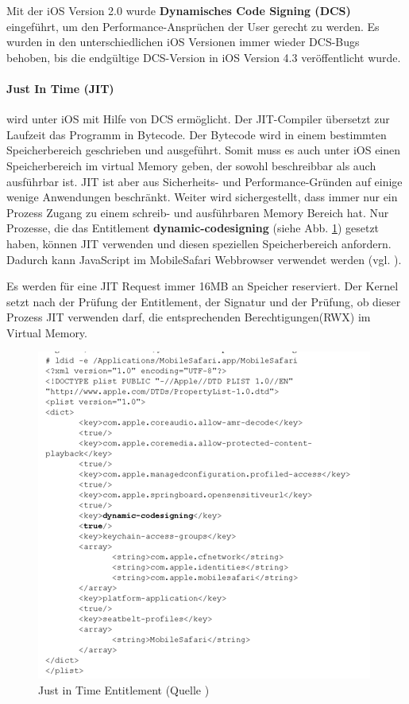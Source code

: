 Mit der iOS Version 2.0 wurde \textbf{Dynamisches Code Signing (DCS)} eingeführt, um den Performance-Ansprüchen der User gerecht zu werden. Es wurden in den unterschiedlichen iOS Versionen immer wieder DCS-Bugs behoben, bis die endgültige DCS-Version in iOS Version 4.3 veröffentlicht wurde. 
\paragraph{Just In Time (JIT)} wird unter iOS mit Hilfe von DCS ermöglicht. Der JIT-Compiler übersetzt zur Laufzeit das Programm in Bytecode. Der Bytecode wird in einem bestimmten Speicherbereich geschrieben und ausgeführt. Somit muss es auch unter iOS einen Speicherbereich im virtual Memory geben, der sowohl beschreibbar als auch ausführbar ist.  JIT ist aber aus Sicherheits- und Performance-Gründen auf einige wenige Anwendungen beschränkt. Weiter wird sichergestellt, dass immer nur ein Prozess Zugang zu einem schreib- und ausführbaren Memory Bereich hat. Nur Prozesse, die das Entitlement \textbf{dynamic-codesigning} (siehe Abb. \ref{fig:JIT}) gesetzt haben, können JIT verwenden und diesen speziellen Speicherbereich anfordern. Dadurch kann JavaScript im MobileSafari Webbrowser verwendet werden (vgl. \cite{ASLR[4]}).

Es werden für eine JIT Request immer 16MB an Speicher reserviert. Der Kernel setzt nach der Prüfung der Entitlement, der Signatur und der Prüfung, ob dieser Prozess JIT verwenden darf, die entsprechenden Berechtigungen(RWX) im Virtual Memory.

\begin{figure}[htp!]
        \centering
                \includegraphics[scale=0.8]{JIT}
        \caption{Just in Time Entitlement (Quelle \cite{Hacking[1]}) }
        \label{fig:JIT}
\end{figure}
\newpage

